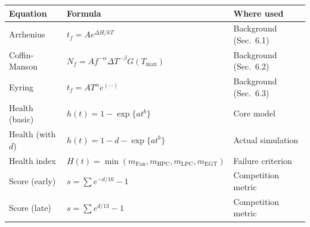 \documentclass[11pt, a4paper]{article}
\begin{document}
\begin{center}
\begin{tabular}{@{}lll@{}}
  \toprule
  Equation & Formula & Where used \\
  \midrule
  Arrhenius & $t_f = Ae^{\Delta H / kT}$ & Background (Sec.~6.1) \\
  Coffin-Manson & $N_f = Af^{-\alpha}\Delta T^{-\beta}G(T_{\max})$ & Background (Sec.~6.2) \\
  Eyring & $t_f = AT^{\alpha}e^{(\cdots)}$ & Background (Sec.~6.3) \\
  Health (basic) & $h(t) = 1 - \exp\{at^b\}$ & Core model \\
  Health (with $d$) & $h(t) = 1 - d - \exp\{at^b\}$ & Actual simulation \\
  Health index & $H(t) = \min(m_\text{Fan}, m_\text{HPC}, m_\text{LPC}, m_\text{EGT})$ & Failure criterion \\
  Score (early) & $s = \sum e^{-d/10} - 1$ & Competition metric \\
  Score (late) & $s = \sum e^{d/13} - 1$ & Competition metric \\
  \bottomrule
\end{tabular}
\end{center}

\end{document}
